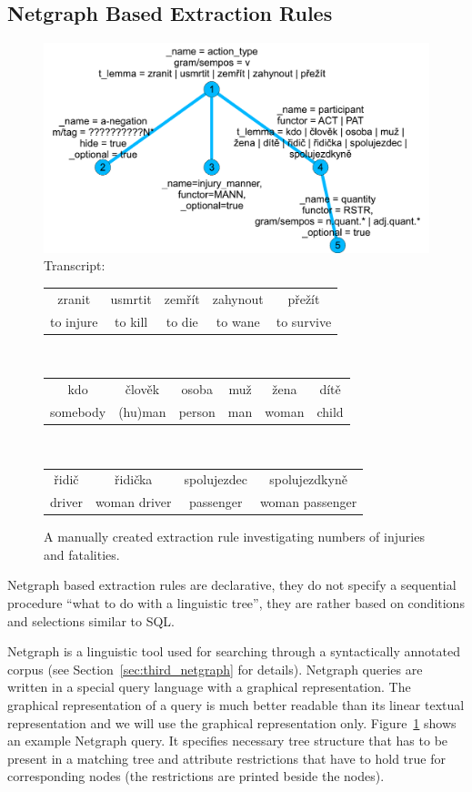 \subsection{Netgraph Based Extraction Rules}

\begin{figure}
	\centering
		\includegraphics[width=0.5\hsize]{extract_patern}		
\\Transcript:\\
\begin{tabular}{|c|c|c|c|c|}
\hline
zranit & usmrtit & zemřít & zahynout & přežít\\
to injure & to kill & to die & to wane & to survive\\
\hline
\end{tabular}
\\\begin{tabular}{|c|c|c|c|c|c|}
\hline
kdo & člověk & osoba & muž & žena & dítě\\
somebody & (hu)man & person & man & woman & child\\
\hline
\end{tabular}
\\\begin{tabular}{|c|c|c|c|}
\hline
řidič & řidička & spolujezdec & spolujezdkyně\\
driver & woman driver & passenger & woman passenger\\	
\hline
\end{tabular}		
	\caption{A manually created extraction rule investigating numbers of injuries and fatalities.}
	\label{fig:manual_extract_patern}
\end{figure}



Netgraph based extraction rules are declarative, they do not specify a sequential procedure ``what to do with a linguistic tree'', they are rather based on conditions and selections similar to SQL.

Netgraph is a linguistic tool used for searching through a syntactically annotated corpus (see Section~\ref{sec:third_netgraph} for details). Netgraph queries are written in a special query language with a graphical representation. The graphical representation of a query is much better readable than its linear textual representation and we will use the graphical representation only. Figure~\ref{fig:manual_extract_patern} shows an example Netgraph query. It specifies necessary tree structure that has to be present in a matching tree and attribute restrictions that have to hold true for corresponding nodes (the restrictions are printed beside the nodes).



